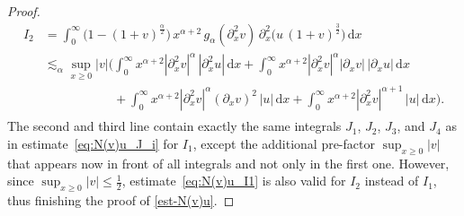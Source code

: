 \documentclass[10pt,a4paper]{amsart}
\renewcommand{\d}{\ensuremath{\mathrm{d}}}
\begin{document}
\begin{proof}
\begin{equation*}
\begin{split}
    I_2
    &=
    \int_0^{\infty} \bigl(1-(1+v)^{\frac{\alpha}{2}}\bigr) \, x^{\alpha+2}\, g_{\alpha}(\partial_x^2 v)\, \partial^2_x\bigl(u\,  (1+v)^{\frac{3}{2}}\bigr) \,\d x
    \\
    &\lesssim_\alpha
    \sup_{x \geq 0} |v|
    \Big(
    \int_0^\infty x^{\alpha+2} |\partial_x^2 v|^\alpha\, |\partial_x^2u|\, \d x 
    + 
    \int_0^\infty x^{\alpha+2} |\partial_x^2 v|^\alpha |\partial_x v|\, |\partial_x u|\, \d x
    \\
    &\phantom{\lesssim_\alpha
    \sup_{x \geq 0} |v| \Big(}
    + \int_0^\infty x^{\alpha+2} |\partial_x^2 v|^\alpha (\partial_x v)^2\, |u|\, \d x
    +
    \int_0^\infty x^{\alpha+2} |\partial_x^2 v|^{\alpha+1}\, |u|\, \d x
    \Big).
\end{split}
\end{equation*}
%
The second and third line contain exactly the same integrals $J_1$, $J_2$, $J_3$, and $J_4$ as in estimate~\eqref{eq:N(v)u_J_i} for $I_1$, except the additional pre-factor $\sup_{x \geq 0} |v|$ that appears now in front of all integrals and not only in the first one. However, since $\sup_{x \ge 0} |v| \le \frac 1 2$, estimate~\eqref{eq:N(v)u_I1} is also valid for $I_2$ instead of $I_1$, thus finishing the proof of \eqref{est-N(v)u}.
\end{proof}
\end{document}
